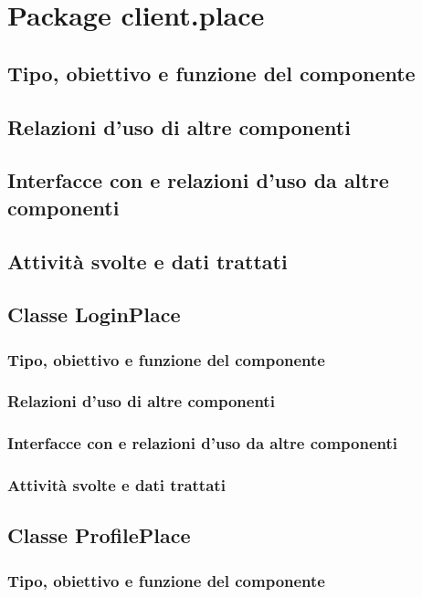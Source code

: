 \newpage
\section{Package client.place} %
\subsection*{Tipo, obiettivo e funzione del componente}
\subsection*{Relazioni d'uso di altre componenti}
\subsection*{Interfacce con e relazioni d'uso da altre componenti}
\subsection*{Attivit\`a svolte e dati trattati}

\subsection{Classe LoginPlace}
\subsubsection*{Tipo, obiettivo e funzione del componente}
\subsubsection*{Relazioni d'uso di altre componenti}
\subsubsection*{Interfacce con e relazioni d'uso da altre componenti}
\subsubsection*{Attivit\`a svolte e dati trattati}

\subsection{Classe ProfilePlace}
\subsubsection*{Tipo, obiettivo e funzione del componente}
